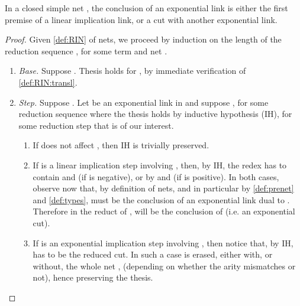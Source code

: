 \begin{lemma}
\label{lem:RIN:exponentials}
In a closed simple net ,
the conclusion of an exponential link is either
the first premise of a linear implication link, or
a cut with another exponential link.
\end{lemma}
\begin{proof}
Given \autoref{def:RIN} of nets, we proceed by induction on the length of 
the reduction sequence , 
for some term  and net .
\begin{enumerate}
\item \textit{Base.} Suppose .
  Thesis holds for , by immediate verification of 
  \autoref{def:RIN:transl}.
\item \textit{Step.} Suppose .
  Let 
    be an exponential link in  
  and suppose ,
    for some reduction sequence 
      where the thesis holds by inductive hypothesis (IH),
        for some reduction step  that is of our interest.
  \begin{enumerate}
  \item If  does not affect , then IH is trivially preserved.
  \item If  is a linear implication step involving , then, by IH, the
    redex has to contain  and 
    (if  is negative), or 
    by  and 
    (if  is positive).
    In both cases, observe now that, by definition of nets, and in particular 
    by \autoref{def:prenet} and \ref{def:types},
     must be the conclusion of an exponential link  dual to .
    Therefore in the reduct of ,  will be the conclusion 
    of  (i.e. an exponential cut).
  \item If  is an exponential implication step involving , then 
    notice that, by IH,  has to be the reduced cut.
    In such a case  is erased,
    either with, or without, the whole net , 
    (depending on whether the arity mismatches or not),
    hence preserving the thesis.
  \end{enumerate}
\end{enumerate}
\vspace{-1.5em}
\end{proof}



